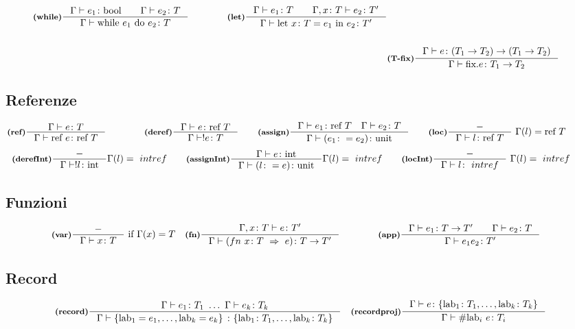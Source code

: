 \documentclass[a4paper, 10pt]{article}
\newcommand{\integer}{\textup{int}}
\newcommand{\bool}{\textup{bool}}
\theoremstyle{definition}
\newcommand{\infer}[4]{\inference[\textbf{#1}]{#2}{#3}#4 }
\begin{document}
\begin{minipage}{.45\linewidth}
\begin{flushleft}
\begin{align*}
		\infer{(while)}{\Gamma\vdash e_1 \colon \bool\qquad \Gamma\vdash e_2 \colon T}{\Gamma \vdash\textup{while}\ e_1\ \textup{do}\ e_2\colon T}{}\qquad\qquad
		\infer{(let)}{\Gamma \vdash e_1\colon T\qquad \Gamma,x\colon T \vdash e_2\colon T'}{
			\Gamma\vdash \textup{let}\ x\colon T = e_1\ \textup{in}\ e_2\colon T'}{} \\ \\
		&\infer{(T-fix)}{\Gamma\vdash e\colon (T_1\rightarrow T_2)\rightarrow(T_1\rightarrow T_2)}{\Gamma\vdash \text{fix}.e\colon T_1\rightarrow T_2}{}
	\end{align*}
\subsection*{Referenze}
	\begin{align*}
		&\infer{(ref)}{\Gamma\vdash e \colon T}{\Gamma\vdash \text{ref } e\colon \text{ref } T}{}  \qquad  \qquad
		\infer{(deref)}{\Gamma\vdash e \colon\text{ref } T}{\Gamma\vdash !e \colon T}{} \qquad
		\infer{(assign)}{\Gamma\vdash e_1\colon \text{ref } T\quad \Gamma\vdash e_2\colon T }{\Gamma\vdash (e_1 \colon = e_2)\colon \text{unit}}{}\qquad
		\infer{(loc)}{-}{\Gamma\vdash l\colon \text{ref } T}{\ \Gamma (l) = \text{ref } T} \qquad
	\end{align*}
	\begin{align*}
	\infer{(derefInt)}{-}{\Gamma\vdash !l \colon \integer}{\Gamma (l) = \text intref} \qquad
	\infer{(assignInt)}{\Gamma\vdash e\colon \integer }{\Gamma\vdash (l \colon = e)\colon \text{unit}}{\Gamma (l) = \text intref}\qquad
	\infer{(locInt)}{-}{\Gamma\vdash l\colon \text intref}{\ \Gamma (l) = \text intref} \qquad
	\end{align*}
\subsection*{Funzioni}
	\begin{align*}
		&\infer{(var)}{-}{\Gamma \vdash x \colon T}{\ \textup{if}\ \Gamma (x) = T} 
		&\infer{(fn)}{\Gamma , x \colon T \vdash e\colon T'}{\Gamma\vdash (fn\ x\colon T\ \Rightarrow\ e )\colon T\rightarrow T'}{} \qquad\qquad
		&\infer{(app)}{\Gamma \vdash e_1 \colon T \rightarrow T'\qquad \Gamma\vdash e_2\colon T}{\Gamma\vdash e_1 e_2\colon T'}{} 
	\end{align*}
\subsection*{Record}
	\begin{align*}
		&\infer{(record)}{\Gamma \vdash e_1 \colon T_1\ \dots\ \Gamma \vdash e_k \colon T_k}{\Gamma \vdash \{\text{lab}_1 = e_1, \dots, \text{lab}_k = e_k \}\ \colon \{\text{lab}_1 \colon T_1,\dots, \text{lab}_k\colon T_k  \} }{}
		&\infer{(recordproj)}{\Gamma\vdash e\colon \{\text{lab}_1\colon T_1,\dots, \text{lab}_k\colon T_k \} }{\Gamma\vdash \# \text{lab}_i\ e \colon T_i}{}
	\end{align*}

		
	\end{flushleft}
\end{minipage}
\end{document}
